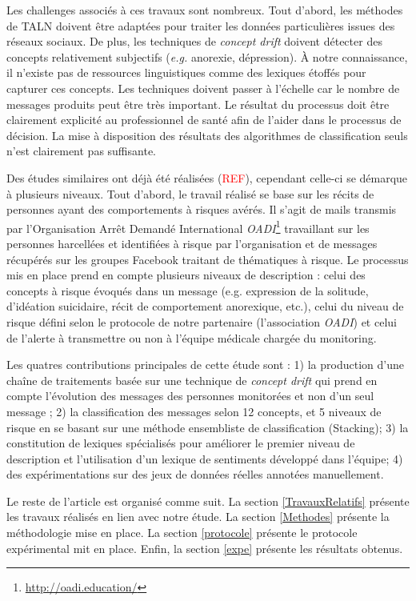  Les challenges associés à ces travaux sont nombreux. Tout d'abord,  les méthodes de TALN doivent être adaptées pour traiter les données particulières issues des réseaux sociaux. %
 De plus, les techniques de \emph{concept drift} doivent  détecter des concepts  relativement subjectifs (\textit{e.g.}  anorexie,  dépression). \`A notre connaissance, il n'existe pas de ressources linguistiques comme des lexiques étoffés pour capturer ces concepts. 
 Les techniques doivent passer à l'échelle car le nombre de messages produits peut être très important. 
Le résultat du processus doit être clairement explicité au professionnel de santé afin de l'aider dans le processus de décision.
La mise à disposition des résultats des algorithmes de classification seuls n'est clairement pas suffisante.

Des études similaires ont déjà été réalisées (\textcolor{red}{REF}), cependant celle-ci se démarque à plusieurs niveaux. Tout d'abord, le travail réalisé se base sur les récits de personnes  ayant des comportements à risques avérés. Il s'agit de mails  transmis par l'Organisation Arrêt Demandé International \textit{OADI}\footnote{\url{http://oadi.education/}} travaillant sur les personnes harcellées et identifiées à risque par l'organisation et de messages récupérés sur les groupes Facebook traitant de thématiques à risque. Le processus mis en place prend en compte plusieurs niveaux de description : celui des concepts à risque évoqués dans un message (e.g. expression de la solitude, d'idéation suicidaire, récit de comportement anorexique, etc.), celui du niveau de risque défini selon le protocole de notre partenaire (l'association \textit{OADI}) et celui de l'alerte à transmettre ou non à l'équipe médicale chargée du monitoring.

 Les quatres contributions principales de cette étude sont : 1) la production d'une chaîne de traitements basée sur une technique de \textit{concept drift} qui prend en compte l'évolution des messages des personnes monitorées et non d'un seul message ; 2) la classification des messages selon 12 concepts, et 5 niveaux de risque en se basant  sur une méthode   ensembliste de classification (Stacking); 3) la constitution de lexiques spécialisés pour améliorer le premier niveau de description et l'utilisation d'un lexique de sentiments développé dans l'équipe; 4) des expérimentations sur des jeux de données réelles annotées manuellement.

Le reste de l'article est organisé comme suit. La section \ref{TravauxRelatifs} présente les travaux réalisés en lien avec notre étude. La section \ref{Methodes} présente la méthodologie mise en place. La section \ref{protocole} présente le protocole expérimental mit en place. Enfin, la section \ref{expe} présente les résultats obtenus.